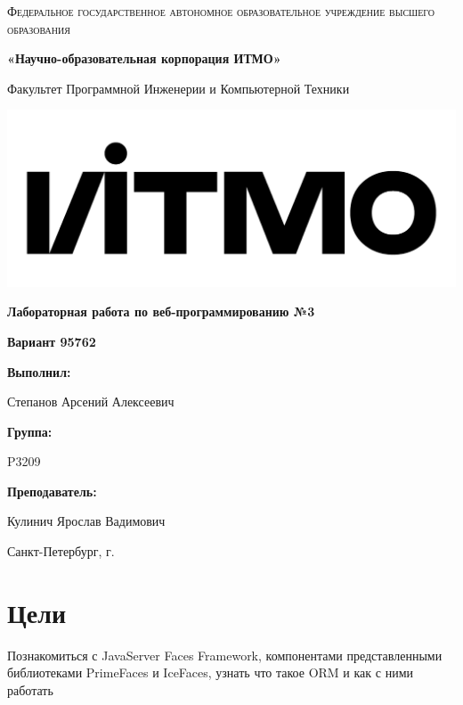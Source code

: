 \documentclass[12pt,a4paper]{report}
\begin{document}
\begin{titlepage} 
	\centering
	{
        \scshape
        Федеральное государственное автономное образовательное учреждение высшего образования
        \par
        \textbf{«Научно-образовательная корпорация ИТМО»}
        \par
        \vspace*{1cm}
        Факультет Программной Инженерии и Компьютерной Техники
        \par
    }
    \vspace*{0.6cm}
    \includegraphics[width=\textwidth]{logo.png}
    {
        \Large
        \textbf{Лабораторная работа по веб-программированию №3}
        \par
        \normalsize
        \vspace*{0.75cm}
        \textbf{Вариант 95762}
        \par
    }
    \vfill
    \hfill\begin{minipage}{\dimexpr\textwidth-7.8cm}
        \textbf{Выполнил:}\par
        Степанов Арсений Алексеевич\par
        \vspace*{0.15cm}
        \textbf{Группа:}\par
        P3209\par
        \vspace*{0.15cm}
        \textbf{Преподаватель:}\par
        Кулинич Ярослав Вадимович\par
    \end{minipage}
    \vfill
    Санкт-Петербург, \the\year{}г.
\end{titlepage}  
\section*{Цели}
Познакомиться с JavaServer Faces Framework, компонентами представленными библиотеками PrimeFaces и IceFaces, узнать что такое ORM и как с ними работать
\end{document}

